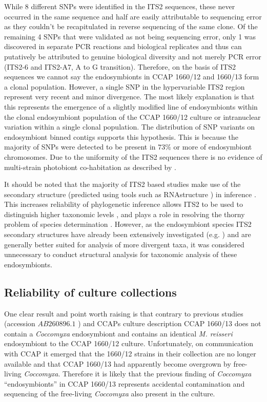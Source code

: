 While 8 different SNPs were identified in the ITS2 sequences, these never occurred in the same
sequence and half are easily attributable to sequencing error as they couldn't be recapitulated
in reverse sequencing of the same clone.  Of the remaining 4 SNPs that were validated
as not being sequencing error, only 1 was discovered in separate PCR reactions and biological replicates
and thus can putatively be attributed to genuine biological diversity and not merely PCR error
(ITS2-6 and ITS2-A7, A to G transition). Therefore, on the basis of ITS2 sequences
we cannot say the endosymbionts in CCAP 1660/12 and 1660/13 form a clonal population.
However, a single SNP in the hypervariable ITS2 region represent very recent and minor
divergence.  The most likely explanation is that this represents the emergence of a slightly modified
line of endosymbionts within the clonal endosymbiont population of the CCAP 1660/12 culture or intranuclear
variation within a single clonal population.  The distribution of SNP variants on endosymbiont binned
contigs supports this hypothesis. This is because the majority of SNPs were detected to be 
present in \(73\%\) or more of endosymbiont chromosomes. 
Due to the uniformity of the ITS2 sequences there is no evidence of multi-strain photobiont co-habitation as 
described by \citep{Hoshina2012}.

It should be noted that the majority of ITS2 based studies make use of the secondary structure (predicted
using tools such as RNAstructure \citep{Mathews2004}) in inference \citep{Schultz2009}. 
This increases reliability of phylogenetic inference \citep{Keller2008} allows ITS2 to be used
to distinguish higher taxonomic levels \citep{Coleman2003}, and plays a role
in resolving the thorny problem of species determination \citep{Muller2007}. 
However, as the endosymbiont species ITS2 secondary structures have already been extensively
investigated (e.g. \citep{Hoshina2008,Hoshina2010}) and are generally better suited
for analysis of more divergent taxa, it was considered 
unnecessary to conduct structural analysis for taxonomic analysis of these
endosymbionts.

\subsection{Reliability of culture collections}

One clear result and point worth raising is that contrary to previous studies 
(accession \(AB260896.1\) \citep{Hoshina2008}) and CCAPs culture description 
CCAP 1660/13 does not contain a \textit{Coccomyxa} endosymbiont and contains 
an identical \textit{M. reisseri} endosymbiont to the CCAP 1660/12 culture. 
Unfortunately, on communication with CCAP it emerged that 
the 1660/12 strains in their collection are no longer available
and that CCAP 1660/13 had apparently become overgrown by free-living \textit{Coccomyxa}. 
Therefore it is likely that the previous finding of \textit{Coccomyxa} ``endosymbionts'' in
CCAP 1660/13 \citep{Hoshina2008} represents accidental contamination and sequencing 
of the free-living \textit{Coccomyxa} also present in the culture. 

